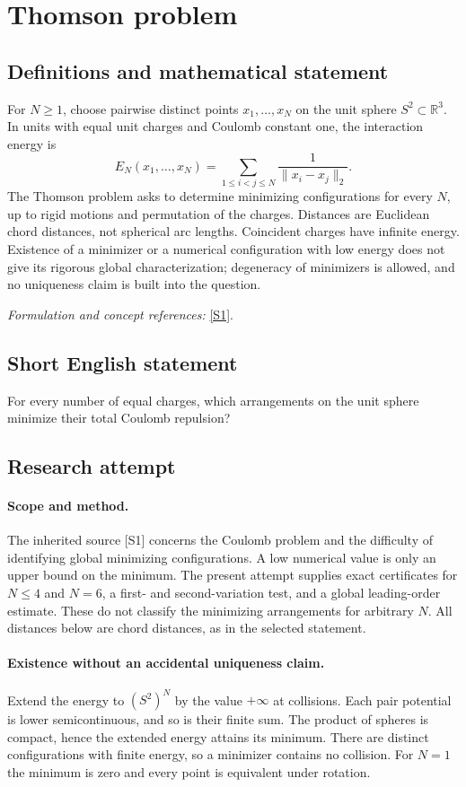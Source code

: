 \documentclass[11pt]{article}
\begin{document}
\section*{\texorpdfstring{Thomson problem}{Thomson problem}}\label{391}
\subsection{Definitions and mathematical statement}
For $N\ge1$, choose pairwise distinct points $x_1,\ldots,x_N$ on the unit sphere $S^2\subset{\mathbb{R}}^3$. In units with equal unit charges and Coulomb constant one, the interaction energy is
\[
 E_N(x_1,\ldots,x_N)=\sum_{1\le i<j\le N}\frac1{\|x_i-x_j\|_2}.
\]
The Thomson problem asks to determine minimizing configurations for every $N$, up to rigid motions and permutation of the charges. Distances are Euclidean chord distances, not spherical arc lengths. Coincident charges have infinite energy. Existence of a minimizer or a numerical configuration with low energy does not give its rigorous global characterization; degeneracy of minimizers is allowed, and no uniqueness claim is built into the question.
\par\smallskip\textit{Formulation and concept references:} \href{https://web.cels.anl.gov/~zippy/publications/thomson/thomsonPRL.html}{[S1]}.

\subsection{Short English statement}
For every number of equal charges, which arrangements on the unit sphere minimize their total Coulomb repulsion?
\subsection{Research attempt}
\paragraph{Scope and method.}
The inherited source [S1] concerns the Coulomb problem and the
difficulty of identifying global minimizing configurations. A low
numerical value is only an upper bound on the minimum. The present
attempt supplies exact certificates for $N\leq4$ and $N=6$, a
first- and second-variation test, and a global leading-order estimate.
These do not classify the minimizing arrangements for arbitrary $N$.
All distances below are chord distances, as in the selected statement.

\paragraph{Existence without an accidental uniqueness claim.}
Extend the energy to $(S^2)^N$ by the value $+\infty$ at collisions.
Each pair potential is lower semicontinuous, and so is their finite
sum. The product of spheres is compact, hence the extended energy
attains its minimum. There are distinct configurations with finite
energy, so a minimizer contains no collision. For $N=1$ the minimum
is zero and every point is equivalent under rotation.
\end{document}
